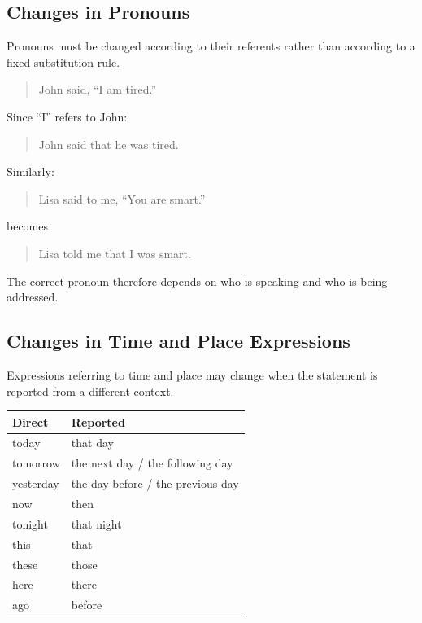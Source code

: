 \subsection{Changes in Pronouns}

Pronouns must be changed according to their referents rather than according
to a fixed substitution rule.

\begin{quotation}
John said, ``I am tired.''
\end{quotation}

Since ``I'' refers to John:

\begin{quotation}
John said that he was tired.
\end{quotation}

Similarly:

\begin{quotation}
Lisa said to me, ``You are smart.''
\end{quotation}

becomes

\begin{quotation}
Lisa told me that I was smart.
\end{quotation}

The correct pronoun therefore depends on who is speaking and who is being
addressed.


\subsection{Changes in Time and Place Expressions}

Expressions referring to time and place may change when the statement is
reported from a different context.

\begin{center}
\begin{tabular}{ll}
\textbf{Direct} & \textbf{Reported} \\ \hline
today & that day \\
tomorrow & the next day / the following day \\
yesterday & the day before / the previous day \\
now & then \\
tonight & that night \\
this & that \\
these & those \\
here & there \\
ago & before
\end{tabular}
\end{center}

